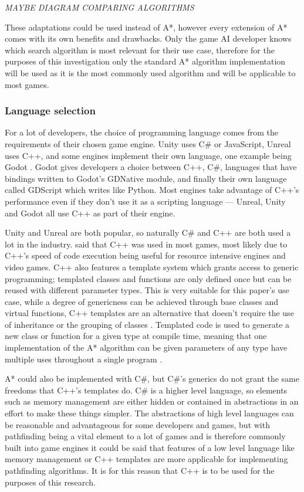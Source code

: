 \documentclass[11pt, a4paper]{article}
\begin{document}
\emph{MAYBE DIAGRAM COMPARING ALGORITHMS}

These adaptations could be used instead of A*, however every extension of A* comes with its own benefits and drawbacks. Only the game AI developer knows which search algorithm is most relevant for their use case, therefore for the purposes of this investigation only the standard A* algorithm implementation will be used as it is the most commonly used algorithm and will be applicable to most games.

\subsubsection{Language selection}

For a lot of developers, the choice of programming language comes from the requirements of their chosen game engine. Unity \parencite{Unity} uses C\# or JavaScript, Unreal \parencite{Unreal} uses C++, and some engines implement their own language, one example being Godot \parencite{Godot}. Godot gives developers a choice between C++, C\#, languages that have bindings written to Godot's GDNative module, and finally their own language called GDScript which writes like Python. Most engines take advantage of C++'s performance even if they don't use it as a scripting language --- Unreal, Unity and Godot all use C++ as part of their engine. 

Unity \parencite{Unity} and Unreal \parencite{Unreal} are both popular, so naturally C\# and C++ are both used a lot in the industry. \citeauthor{blow2004game} \parencite*[30]{blow2004game} said that C++ was used in most games, most likely due to C++'s speed of code execution being useful for resource intensive engines and video games. C++ also features a template system which grants access to generic programming; templated classes and functions are only defined once but can be reused with different parameter types. This is very suitable for this paper's use case, while a degree of genericness can be achieved through base classes and virtual functions, C++ templates are an alternative that doesn't require the use of inheritance or the grouping of classes \parencite[117]{higgins2002generic}. Templated code is used to generate a new class or function for a given type at compile time, meaning that one implementation of the A* algorithm can be given parameters of any type have multiple uses throughout a single program \parencite[120]{higgins2002generic}.

A* could also be implemented with C\#, but C\#'s generics do not grant the same freedoms that C++'s templates do. C\# is a higher level language, so elements such as memory management are either hidden or contained in abstractions in an effort to make these things simpler. The abstractions of high level languages can be reasonable and advantageous for some developers and games, but with pathfinding being a vital element to a lot of games and is therefore commonly built into game engines it could be said that features of a low level language like memory management or C++ templates are more applicable for implementing pathfinding algorithms. It is for this reason that C++ is to be used for the purposes of this research.
\end{document}
